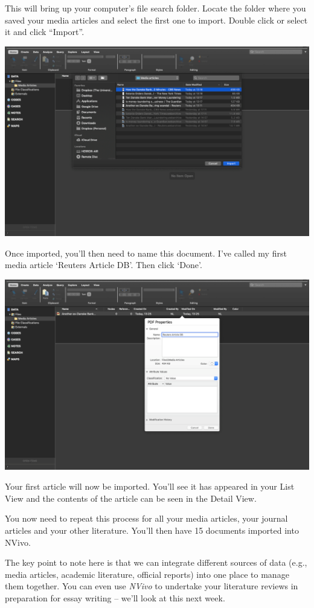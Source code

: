 \documentclass[
]{book}
\begin{document}
This will bring up your computer's file search folder. Locate the folder where you saved your media articles and select the first one to import. Double click or select it and click ``Import''.

\includegraphics{imgs/import_pdf2.png}

Once imported, you'll then need to name this document. I've called my first media article `Reuters Article DB'. Then click `Done'.

\includegraphics{imgs/name_pdf.png}

Your first article will now be imported. You'll see it has appeared in your List View and the contents of the article can be seen in the Detail View.

You now need to repeat this process for all your media articles, your journal articles and your other literature. You'll then have 15 documents imported into NVivo.

The key point to note here is that we can integrate different sources of data (e.g., media articles, academic literature, official reports) into one place to manage them together. You can even use \emph{NVivo} to undertake your literature reviews in preparation for essay writing -- we'll look at this next week.
\end{document}
